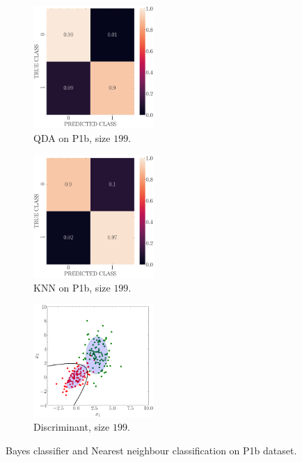 \documentclass[11pt, a4 paper]{article}
\begin{document}
\begin{figure}[!htbp]
\quad    
    \begin{subfigure}[!htbp]{0.24\textwidth}
       \centering
       \includegraphics[width=1.8in]{../results/ex1/conf_mtx_QD_ML_dataset_P1b_size_199.pdf}
       \caption{QDA on P1b, size $199$.}
       \label{fig:KNN_P1b_199}
    \end{subfigure}
\quad    
    \begin{subfigure}[!htbp]{0.24\textwidth}
       \centering
       \includegraphics[width=1.8in]{../results/ex1/conf_mtx_KNN_dataset_P1b_size_199.pdf}
       \caption{KNN on P1b, size $199$.}
       \label{fig:KNN_P1b_199}
    \end{subfigure}
\quad
    \begin{subfigure}[!htbp]{0.24\textwidth}
       \centering
       \includegraphics[width=1.8in]{../results/ex1/samples_QD_ML_dataset_P1b_size_199.pdf}
       \caption{Discriminant, size $199$.}
       \label{fig:KNN_P1b_199}
    \end{subfigure}

\caption{Bayes classifier and Nearest neighbour classification on P1b dataset.}
\label{fig:ex11P1b}
\end{figure}
\end{document}
